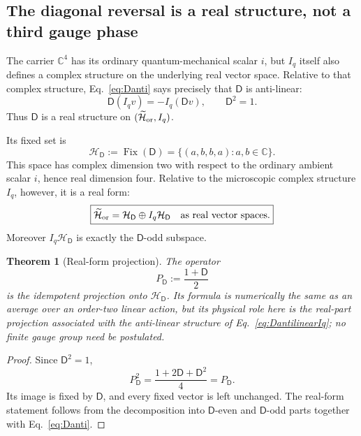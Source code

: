 \documentclass[11pt]{article}
\newtheorem{theorem}{Theorem}[section]
\theoremstyle{definition}\newtheorem{definition}[theorem]{Definition}
\theoremstyle{remark}\newtheorem{remark}[theorem]{Remark}\newtheorem{conjecture}[theorem]{Conjecture}
\begin{document}
\subsection{The diagonal reversal is a real structure, not a third gauge phase}\label{subsec:Drealform}
The carrier $\mathbb C^4$ has its ordinary quantum-mechanical scalar $i$, but $I_q$ itself also defines a complex structure on the underlying real vector space. Relative to that complex structure, Eq.~\eqref{eq:Danti} says precisely that $\mathsf D$ is anti-linear:
\begin{equation}\label{eq:DantilinearIq}
 \boxed{\mathsf D(I_qv)=-I_q(\mathsf Dv),\qquad \mathsf D^2=1.}
\end{equation}
Thus $\mathsf D$ is a real structure on $(\widetilde{\mathcal H}_{\rm or},I_q)$.

Its fixed set is
\begin{equation}\label{eq:VDfixed}
 \mathcal H_{\mathsf D}
 :=\operatorname{Fix}(\mathsf D)
 =\{(a,b,b,a):a,b\in\mathbb C\}.
\end{equation}
This space has complex dimension two with respect to the ordinary ambient scalar $i$, hence real dimension four. Relative to the microscopic complex structure $I_q$, however, it is a real form:
\begin{equation}\label{eq:realformdecomp}
 \boxed{
 \widetilde{\mathcal H}_{\rm or}
 =\mathcal H_{\mathsf D}\oplus I_q\mathcal H_{\mathsf D}
 \quad\text{as real vector spaces}.}
\end{equation}
Moreover $I_q\mathcal H_{\mathsf D}$ is exactly the $\mathsf D$-odd subspace.

\begin{theorem}[Real-form projection]\label{thm:Drealform}
The operator
\begin{equation}\label{eq:PD}
 P_{\mathsf D}:=\frac{1+\mathsf D}{2}
\end{equation}
is the idempotent projection onto $\mathcal H_{\mathsf D}$. Its formula is numerically the same as an average over an order-two linear action, but its physical role here is the real-part projection associated with the anti-linear structure of Eq.~\eqref{eq:DantilinearIq}; no finite gauge group need be postulated.
\end{theorem}
\begin{proof}
Since $\mathsf D^2=1$,
\begin{equation}
 P_{\mathsf D}^2=\frac{1+2\mathsf D+\mathsf D^2}{4}=P_{\mathsf D}.
\end{equation}
Its image is fixed by $\mathsf D$, and every fixed vector is left unchanged. The real-form statement follows from the decomposition into $\mathsf D$-even and $\mathsf D$-odd parts together with Eq.~\eqref{eq:Danti}.
\end{proof}
\end{document}
